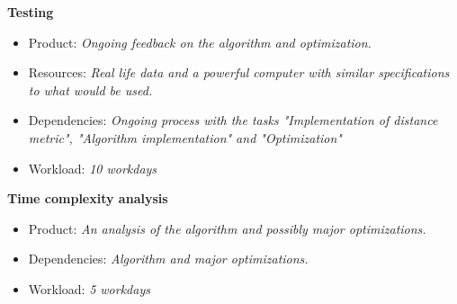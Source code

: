 \documentclass[12pt,a4paper]{article}
\begin{document}
\noindent
\textbf{Testing}
\begin{itemize}
\item Product: \textit{Ongoing feedback on the algorithm and optimization.}
\item Resources: \textit{Real life data and a powerful computer with similar specifications to what would be used.}
\item Dependencies: \textit{Ongoing process with the tasks "Implementation of distance metric", "Algorithm implementation" and "Optimization"}
\item Workload: \textit{10 workdays}
\end{itemize}

\noindent
\textbf{Time complexity analysis}
\begin{itemize}
\item Product: \textit{An analysis of the algorithm and possibly major optimizations.}
\item Dependencies: \textit{Algorithm and major optimizations.}
\item Workload: \textit{5 workdays}
\end{itemize}


\begin{gantt}[xunitlength=0.5cm,fontsize=\small,titlefontsize=\small]{10}{20}
  \begin{ganttitle}
  \end{ganttitle}
\end{gantt}
\end{document}

